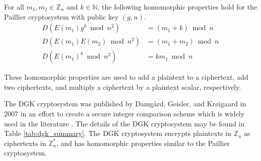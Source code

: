


For all $m_1,m_2 \in \mathbb{Z}_n$ and $k\in \mathbb{N}$, the following homomorphic properties hold for the Paillier cryptosystem with public key $(g,n)$.
\begin{align*}
  D(E(m_1)g^k\bmod n^2) &=(m_1+k)\bmod n\\
  D(E(m_1)E(m_2)\bmod n^2) &=(m_1+m_2)\bmod n\\
  D(E(m_1)^k\bmod n^2) &= km_1\bmod n
\end{align*}

These homomorphic properties are used to add a plaintext to a ciphertext, add two ciphertexts, and multiply a ciphertext by a plaintext scalar, respectively.

The DGK cryptosystem was published by Damg{\aa}rd, Geisler, and Kr{\o}igaard in 2007 in an effort to create a secure integer comparison scheme \cite{pieprzyk_efficient_2007, cryptoeprint:2008:321} which is widely used in the literature \cite{veugen_improving_2012}.
 The details of the DGK cryptosystem may be found in Table \ref{tab:dgk_summary}. The DGK cryptosystem encrypts plaintexts in $\mathbb{Z}_u$ as ciphertexts in $\mathbb{Z}_n^\ast$, and has homomorphic properties similar to the Paillier cryptosystem.

